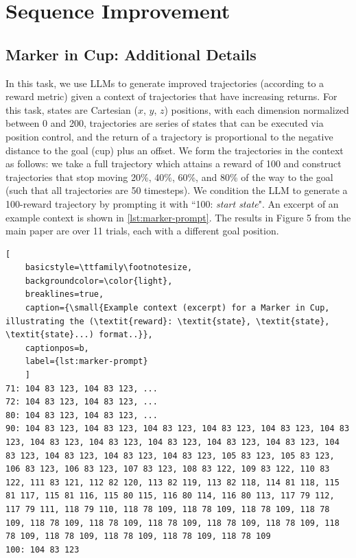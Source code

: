 \section{Sequence Improvement}

\subsection{Marker in Cup: Additional Details}

In this task, we use LLMs to generate improved trajectories (according to a reward metric) given a context of trajectories that have increasing returns. For this task, states are Cartesian ($x$, $y$, $z$) positions, with each dimension normalized between 0 and 200, trajectories are series of states that can be executed via position control, and the return of a trajectory is proportional to the negative distance to the goal (cup) plus an offset. We form the trajectories in the context as follows: we take a full trajectory which attains a reward of 100 and construct trajectories that stop moving 20\%, 40\%, 60\%, and 80\% of the way to the goal (such that all trajectories are 50 timesteps). We condition the LLM to generate a 100-reward trajectory by prompting it with ``100: \textit{start state}".  An excerpt of an example context is shown in \cref{lst:marker-prompt}. The results in Figure 5 from the main paper are over 11 trials, each with a different goal position.

\begin{lstlisting}[
    basicstyle=\ttfamily\footnotesize,
    backgroundcolor=\color{light},
    breaklines=true,
    caption={\small{Example context (excerpt) for a Marker in Cup, illustrating the (\textit{reward}: \textit{state}, \textit{state}, \textit{state}...) format..}},
    captionpos=b,
    label={lst:marker-prompt}
    ]
71: 104 83 123, 104 83 123, ...
72: 104 83 123, 104 83 123, ...
80: 104 83 123, 104 83 123, ...
90: 104 83 123, 104 83 123, 104 83 123, 104 83 123, 104 83 123, 104 83 123, 104 83 123, 104 83 123, 104 83 123, 104 83 123, 104 83 123, 104 83 123, 104 83 123, 104 83 123, 104 83 123, 105 83 123, 105 83 123, 106 83 123, 106 83 123, 107 83 123, 108 83 122, 109 83 122, 110 83 122, 111 83 121, 112 82 120, 113 82 119, 113 82 118, 114 81 118, 115 81 117, 115 81 116, 115 80 115, 116 80 114, 116 80 113, 117 79 112, 117 79 111, 118 79 110, 118 78 109, 118 78 109, 118 78 109, 118 78 109, 118 78 109, 118 78 109, 118 78 109, 118 78 109, 118 78 109, 118 78 109, 118 78 109, 118 78 109, 118 78 109, 118 78 109
100: 104 83 123
\end{lstlisting}

